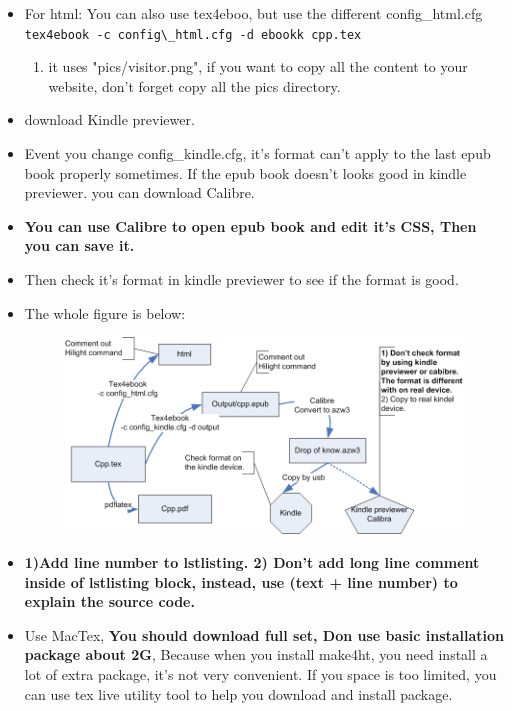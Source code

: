 \documentclass[a4paper,12pt,twoside]{book}
\begin{document}
\begin{itemize}
\item For html: You can also use tex4eboo, but use the different config\_html.cfg \\
\verb|tex4ebook -c config\_html.cfg -d ebookk cpp.tex|
\begin{enumerate}
	\item it uses "pics/visitor.png", if you want to copy all the content to your website, don't forget copy all the pics directory.
\end{enumerate}

\item download Kindle previewer.

\item Event you change config\_kindle.cfg, it's format can't apply to the last epub book properly sometimes.  If the epub book doesn't looks good in kindle previewer. you can download Calibre. 

\item \textbf{You can use Calibre to open epub book and edit it's CSS, Then you can save it.}

\item Then check it's format in kindle previewer to see if the format is good. 

\item The whole figure is below:
\begin{figure}
	\centering
	\includegraphics[width=0.7\linewidth]{pics/ebook.png}
	\caption{}
	\label{fig:ebook}
\end{figure}

\item \textbf{ 1)Add line number to lstlisting. 2) Don't add long line comment inside of lstlisting block, instead, use (text + line number) to explain the source code.}



\item Use MacTex, \textbf{You should download full set, Don use basic installation package about 2G}, Because when you install make4ht, you need install a lot of extra package, it's not very convenient. If you space is too limited, you can use tex live utility tool to help you download and install package. 


\end{itemize}
\end{document}
